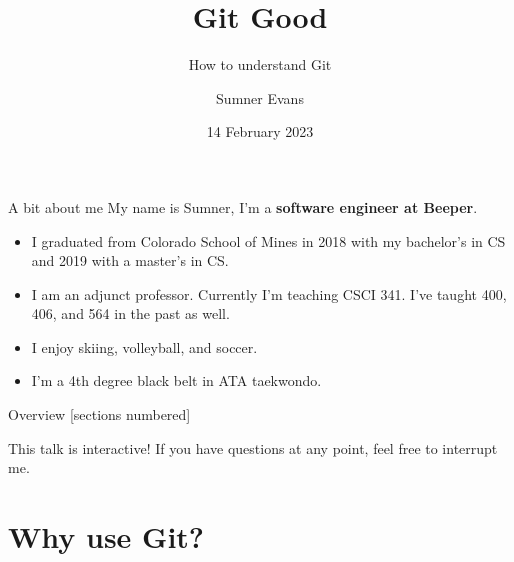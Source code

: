 \documentclass{beeper}
\title{Git Good}
\subtitle{How to understand Git}
\author{Sumner Evans}
\institute{Mines ACM}
\date{14 February 2023}
\begin{document}
\begin{frame}{A bit about me}
    My name is Sumner, I'm a \textbf{software engineer at Beeper}.
    \begin{itemize}
        \item I graduated from Colorado School of Mines in 2018 with my
            bachelor's in CS and 2019 with a master's in CS.
        \item I am an adjunct professor. Currently I'm teaching CSCI 341. I've
            taught 400, 406, and 564 in the past as well.
        \item I enjoy skiing, volleyball, and soccer.
        \item I'm a 4th degree black belt in ATA taekwondo.
    \end{itemize}
\end{frame}

\begin{frame}{Overview}
    [sections numbered]
    \tableofcontents[hideallsubsections]

    \begin{block}{This talk is interactive!}
        If you have questions at any point, feel free to interrupt me.
    \end{block}
\end{frame}

\section{Why use Git?}


\end{document}
